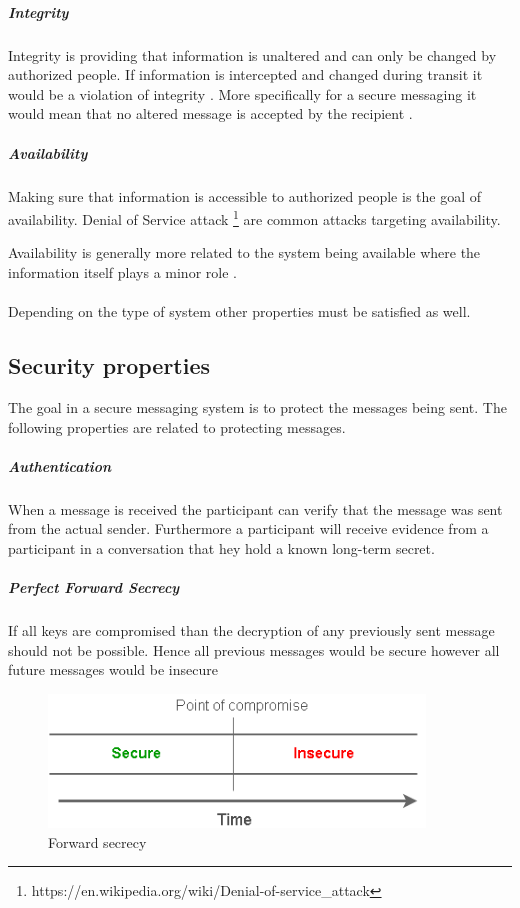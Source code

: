 \subparagraph{Integrity}
Integrity is providing that information is unaltered and can only be changed by authorized people. If information is intercepted and changed during transit it would be a violation of integrity \cite{michael2012}.  
More specifically for a secure messaging it would mean that no altered message is accepted by the recipient \cite{sok}.

\subparagraph{Availability}
Making sure that information is accessible to authorized people is the goal of availability. Denial of Service attack \footnote{https://en.wikipedia.org/wiki/Denial-of-service\_attack} are common attacks targeting availability. 

Availability is generally more related to the system being available where the information itself plays a minor role \cite{michael2012}.
\\
\\
Depending on the type of system other properties must be satisfied as well. 


\subsection{Security properties}
The goal in a secure messaging system is to protect the messages being sent. The following properties are related to protecting messages.


\subparagraph{Authentication}
When a message is received the participant can verify that the message was sent from the actual sender. Furthermore a participant will receive evidence from a participant in a conversation that hey hold a known long-term secret. 



\subparagraph{Perfect Forward Secrecy}
If all keys are compromised than the decryption of any previously sent message should not be possible. Hence all previous messages would be secure however all future messages would be insecure 

\begin{figure}[H]
	\centering
	\includegraphics[width=10cm]{figures/forwardsecrecy.png}
	\caption{Forward secrecy}
	\label{fig:forward}
\end{figure}

